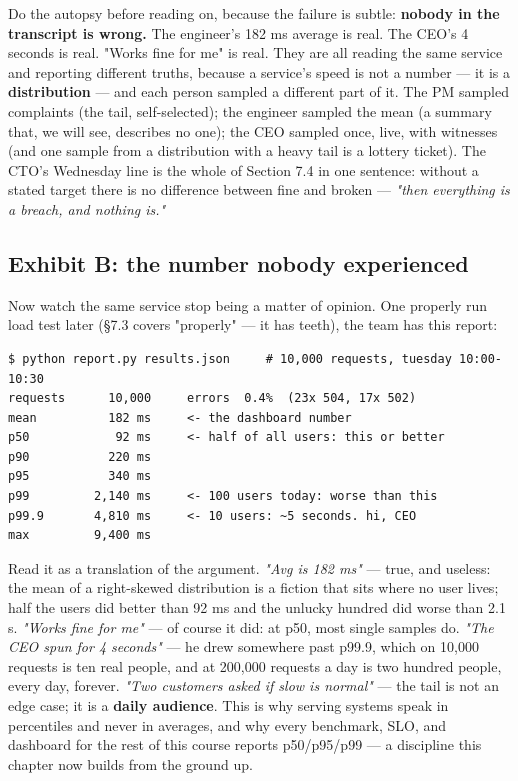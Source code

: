 Do the autopsy before reading on, because the failure is subtle: \textbf{nobody in the transcript is wrong.} The engineer's 182 ms average is real. The CEO's 4 seconds is real. "Works fine for me" is real. They are all reading the same service and reporting different truths, because a service's speed is not a number — it is a \textbf{distribution} — and each person sampled a different part of it. The PM sampled complaints (the tail, self-selected); the engineer sampled the mean (a summary that, we will see, describes no one); the CEO sampled once, live, with witnesses (and one sample from a distribution with a heavy tail is a lottery ticket). The CTO's Wednesday line is the whole of Section 7.4 in one sentence: without a stated target there is no difference between fine and broken — \textit{"then everything is a breach, and nothing is."}

\subsection*{Exhibit B: the number nobody experienced}

Now watch the same service stop being a matter of opinion. One properly run load test later (§7.3 covers "properly" — it has teeth), the team has this report:

\begin{terminalbox}
\begin{Verbatim}[breaklines=true,breakanywhere=true,fontsize=\small,formatcom=\color{tbbtermfg},codes=\tbbcodeactive]
$ python report.py results.json     # 10,000 requests, tuesday 10:00-10:30
requests      10,000     errors  0.4%  (23x 504, 17x 502)
mean          182 ms     <- the dashboard number
p50            92 ms     <- half of all users: this or better
p90           220 ms
p95           340 ms
p99         2,140 ms     <- 100 users today: worse than this
p99.9       4,810 ms     <- 10 users: ~5 seconds. hi, CEO
max         9,400 ms
\end{Verbatim}
\end{terminalbox}

Read it as a translation of the argument. \textit{"Avg is 182 ms"} — true, and useless: the mean of a right-skewed distribution is a fiction that sits where no user lives; half the users did better than 92 ms and the unlucky hundred did worse than 2.1 s. \textit{"Works fine for me"} — of course it did: at p50, most single samples do. \textit{"The CEO spun for 4 seconds"} — he drew somewhere past p99.9, which on 10,000 requests is ten real people, and at 200,000 requests a day is two hundred people, every day, forever. \textit{"Two customers asked if slow is normal"} — the tail is not an edge case; it is a \textbf{daily audience}. This is why serving systems speak in percentiles and never in averages, and why every benchmark, SLO, and dashboard for the rest of this course reports p50/p95/p99 — a discipline this chapter now builds from the ground up.

